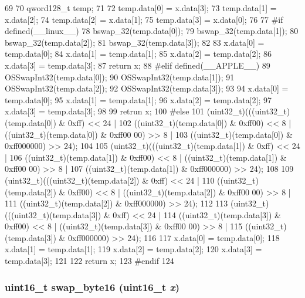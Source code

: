 \begin{DoxyCode}
69 {
70   qword128_t temp;
71 
72   temp.data[0] = x.data[3];
73   temp.data[1] = x.data[2];
74   temp.data[2] = x.data[1];
75   temp.data[3] = x.data[0];
76 
77 #if defined(__linux__)
78     bswap_32(temp.data[0]);
79     bswap_32(temp.data[1]);
80     bswap_32(temp.data[2]);
81     bswap_32(temp.data[3]);
82 
83     x.data[0] = temp.data[0];
84     x.data[1] = temp.data[1];
85     x.data[2] = temp.data[2];
86     x.data[3] = temp.data[3];
87     return x;
88 #elif defined(__APPLE__)
89     OSSwapInt32(temp.data[0]);
90     OSSwapInt32(temp.data[1]);
91     OSSwapInt32(temp.data[2]);
92     OSSwapInt32(temp.data[3]);
93 
94     x.data[0] = temp.data[0];
95     x.data[1] = temp.data[1];
96     x.data[2] = temp.data[2];
97     x.data[3] = temp.data[3];
98     
99     retrun x;
100 #else
101     (uint32_t)(((uint32_t)(temp.data[0]) & 0xff) << 24 |
102     ((uint32_t)(temp.data[0]) & 0xff00) << 8 | ((uint32_t)(temp.data[0]) & 0xff00
      00) >> 8 |
103     ((uint32_t)(temp.data[0]) & 0xff000000) >> 24);
104 
105     (uint32_t)(((uint32_t)(temp.data[1]) & 0xff) << 24 |
106     ((uint32_t)(temp.data[1]) & 0xff00) << 8 | ((uint32_t)(temp.data[1]) & 0xff00
      00) >> 8 |
107     ((uint32_t)(temp.data[1]) & 0xff000000) >> 24);
108 
109     (uint32_t)(((uint32_t)(temp.data[2]) & 0xff) << 24 |
110     ((uint32_t)(temp.data[2]) & 0xff00) << 8 | ((uint32_t)(temp.data[2]) & 0xff00
      00) >> 8 |
111     ((uint32_t)(temp.data[2]) & 0xff000000) >> 24);
112 
113     (uint32_t)(((uint32_t)(temp.data[3]) & 0xff) << 24 |
114     ((uint32_t)(temp.data[3]) & 0xff00) << 8 | ((uint32_t)(temp.data[3]) & 0xff00
      00) >> 8 |
115     ((uint32_t)(temp.data[3]) & 0xff000000) >> 24);
116 
117     x.data[0] = temp.data[0];
118     x.data[1] = temp.data[1];
119     x.data[2] = temp.data[2];
120     x.data[3] = temp.data[3];
121 
122     return x;
123 #endif
124 }
\end{DoxyCode}
\hypertarget{byteswap_8hh_a657b67db48aed3619d03cb886d87cb03}{
\subsubsection[{swap\_\-byte16}]{\setlength{\rightskip}{0pt plus 5cm}uint16\_\-t swap\_\-byte16 (uint16\_\-t {\em x})}}
\label{byteswap_8hh_a657b67db48aed3619d03cb886d87cb03}




